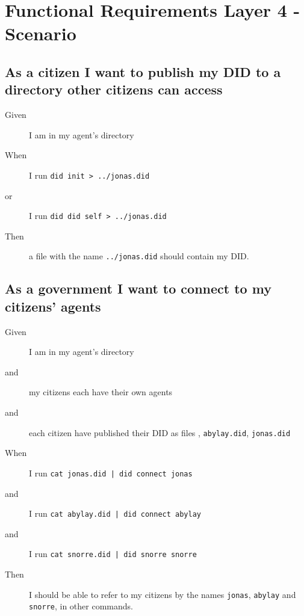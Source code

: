 \newpage



\section{Functional Requirements Layer 4 - Scenario}



\subsection{As a citizen I want to publish my DID to a directory other citizens can access}
\begin{description}\begin{description}
    \item[Given] I am in my agent's directory
    \item[When] I run \texttt{did init > ../jonas.did}
    \item[or] I run \texttt{did did self > ../jonas.did}
    \item[Then] a file with the name \texttt{../jonas.did} should contain my DID.
\end{description}\end{description}



\subsection{As a government I want to connect to my citizens' agents}
\begin{description}\begin{description}
    \item[Given] I am in my agent's directory
    \item[and] my citizens each have their own agents
    \item[and] each citizen have published their DID as files , \texttt{abylay.did}, \texttt{jonas.did}
    \item[When] I run \texttt{cat jonas.did | did connect jonas}
    \item[and] I run \texttt{cat abylay.did | did connect abylay}
    \item[and] I run \texttt{cat snorre.did | did snorre snorre}
    \item[Then] I should be able to refer to my citizens by the names \texttt{jonas}, \texttt{abylay} and \texttt{snorre}, in other commands.
\end{description}\end{description}



